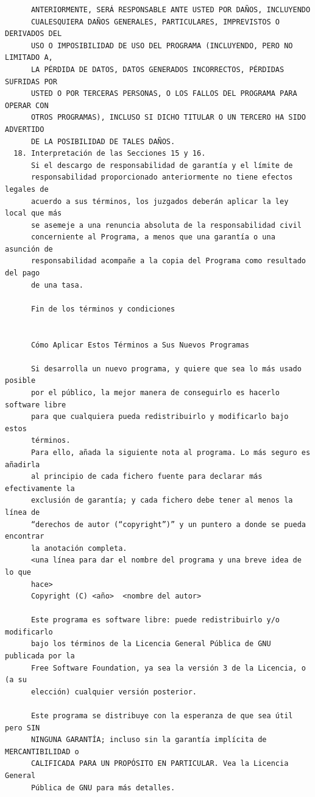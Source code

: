 \begin{verbatim}
      ANTERIORMENTE, SERÁ RESPONSABLE ANTE USTED POR DAÑOS, INCLUYENDO
      CUALESQUIERA DAÑOS GENERALES, PARTICULARES, IMPREVISTOS O DERIVADOS DEL
      USO O IMPOSIBILIDAD DE USO DEL PROGRAMA (INCLUYENDO, PERO NO LIMITADO A,
      LA PÉRDIDA DE DATOS, DATOS GENERADOS INCORRECTOS, PÉRDIDAS SUFRIDAS POR
      USTED O POR TERCERAS PERSONAS, O LOS FALLOS DEL PROGRAMA PARA OPERAR CON
      OTROS PROGRAMAS), INCLUSO SI DICHO TITULAR O UN TERCERO HA SIDO ADVERTIDO
      DE LA POSIBILIDAD DE TALES DAÑOS.
  18. Interpretación de las Secciones 15 y 16.
      Si el descargo de responsabilidad de garantía y el límite de
      responsabilidad proporcionado anteriormente no tiene efectos legales de
      acuerdo a sus términos, los juzgados deberán aplicar la ley local que más
      se asemeje a una renuncia absoluta de la responsabilidad civil
      concerniente al Programa, a menos que una garantía o una asunción de
      responsabilidad acompañe a la copia del Programa como resultado del pago
      de una tasa.

      Fin de los términos y condiciones


      Cómo Aplicar Estos Términos a Sus Nuevos Programas

      Si desarrolla un nuevo programa, y quiere que sea lo más usado posible
      por el público, la mejor manera de conseguirlo es hacerlo software libre
      para que cualquiera pueda redistribuirlo y modificarlo bajo estos
      términos.
      Para ello, añada la siguiente nota al programa. Lo más seguro es añadirla
      al principio de cada fichero fuente para declarar más efectivamente la
      exclusión de garantía; y cada fichero debe tener al menos la línea de
      “derechos de autor (“copyright”)” y un puntero a donde se pueda encontrar
      la anotación completa.
      <una línea para dar el nombre del programa y una breve idea de lo que
      hace>
      Copyright (C) <año>  <nombre del autor>

      Este programa es software libre: puede redistribuirlo y/o modificarlo
      bajo los términos de la Licencia General Pública de GNU publicada por la 
      Free Software Foundation, ya sea la versión 3 de la Licencia, o (a su
      elección) cualquier versión posterior.

      Este programa se distribuye con la esperanza de que sea útil pero SIN
      NINGUNA GARANTÍA; incluso sin la garantía implícita de MERCANTIBILIDAD o
      CALIFICADA PARA UN PROPÓSITO EN PARTICULAR. Vea la Licencia General
      Pública de GNU para más detalles.


\end{verbatim}
